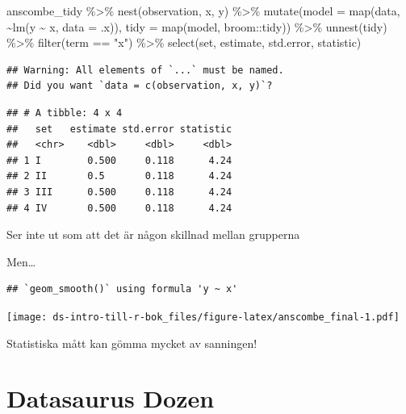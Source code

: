 \documentclass[
]{book}
\newenvironment{Shaded}{\begin{snugshade}}{\end{snugshade}}
\newcommand{\AttributeTok}[1]{\textcolor[rgb]{0.77,0.63,0.00}{#1}}
\newcommand{\FunctionTok}[1]{\textcolor[rgb]{0.00,0.00,0.00}{#1}}
\newcommand{\NormalTok}[1]{#1}
\newcommand{\SpecialCharTok}[1]{\textcolor[rgb]{0.00,0.00,0.00}{#1}}
\newcommand{\StringTok}[1]{\textcolor[rgb]{0.31,0.60,0.02}{#1}}
\begin{document}
\begin{Shaded}
\begin{Highlighting}[]
\NormalTok{anscombe\_tidy }\SpecialCharTok{\%\textgreater{}\%} 
  \FunctionTok{nest}\NormalTok{(observation, x, y) }\SpecialCharTok{\%\textgreater{}\%} 
  \FunctionTok{mutate}\NormalTok{(}\AttributeTok{model =} \FunctionTok{map}\NormalTok{(data, }\SpecialCharTok{\textasciitilde{}}\FunctionTok{lm}\NormalTok{(y }\SpecialCharTok{\textasciitilde{}}\NormalTok{ x, }\AttributeTok{data =}\NormalTok{ .x)),}
         \AttributeTok{tidy =} \FunctionTok{map}\NormalTok{(model, broom}\SpecialCharTok{::}\NormalTok{tidy)) }\SpecialCharTok{\%\textgreater{}\%} 
  \FunctionTok{unnest}\NormalTok{(tidy) }\SpecialCharTok{\%\textgreater{}\%} 
  \FunctionTok{filter}\NormalTok{(term }\SpecialCharTok{==} \StringTok{"x"}\NormalTok{) }\SpecialCharTok{\%\textgreater{}\%} 
  \FunctionTok{select}\NormalTok{(set, estimate, std.error, statistic)}
\end{Highlighting}
\end{Shaded}

\begin{verbatim}
## Warning: All elements of `...` must be named.
## Did you want `data = c(observation, x, y)`?
\end{verbatim}

\begin{verbatim}
## # A tibble: 4 x 4
##   set   estimate std.error statistic
##   <chr>    <dbl>     <dbl>     <dbl>
## 1 I        0.500     0.118      4.24
## 2 II       0.5       0.118      4.24
## 3 III      0.500     0.118      4.24
## 4 IV       0.500     0.118      4.24
\end{verbatim}

Ser inte ut som att det är någon skillnad mellan grupperna

Men\ldots{}

\begin{verbatim}
## `geom_smooth()` using formula 'y ~ x'
\end{verbatim}

\texttt{[image: ds-intro-till-r-bok\_files/figure-latex/anscombe\_final-1.pdf]}

Statistiska mått kan gömma mycket av sanningen!

\hypertarget{datasaurus-dozen}{%
\section{Datasaurus Dozen}\label{datasaurus-dozen}}
\end{document}
